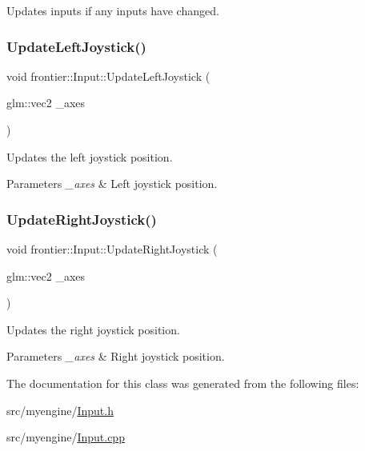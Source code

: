 Updates inputs if any inputs have changed. 

\mbox{\label{classfrontier_1_1_input_af436dc35f51cc350434bb4b5bebbb863}} 
\subsubsection{\texorpdfstring{Update\+Left\+Joystick()}{UpdateLeftJoystick()}}
{\footnotesize\ttfamily void frontier\+::\+Input\+::\+Update\+Left\+Joystick (\begin{DoxyParamCaption}\item[{glm\+::vec2}]{\+\_\+axes }\end{DoxyParamCaption})}



Updates the left joystick position. 


\begin{DoxyParams}{Parameters}
{\em \+\_\+axes} & Left joystick position. \\
\hline
\end{DoxyParams}
\mbox{\label{classfrontier_1_1_input_afd452bb826ade00ba984e249253c946d}} 
\subsubsection{\texorpdfstring{Update\+Right\+Joystick()}{UpdateRightJoystick()}}
{\footnotesize\ttfamily void frontier\+::\+Input\+::\+Update\+Right\+Joystick (\begin{DoxyParamCaption}\item[{glm\+::vec2}]{\+\_\+axes }\end{DoxyParamCaption})}



Updates the right joystick position. 


\begin{DoxyParams}{Parameters}
{\em \+\_\+axes} & Right joystick position. \\
\hline
\end{DoxyParams}


The documentation for this class was generated from the following files\+:\begin{DoxyCompactItemize}
\item 
src/myengine/\hyperlink{_input_8h}{Input.\+h}\item 
src/myengine/\hyperlink{_input_8cpp}{Input.\+cpp}\end{DoxyCompactItemize}
